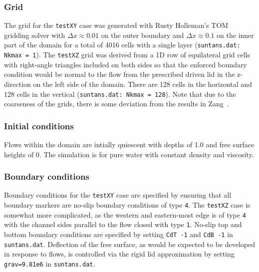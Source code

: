 \subsubsection{Grid}

The grid for the \verb+testXY+ case was generated with Rusty Holleman's 
TOM gridding solver with $\Delta x\approx 0.01$ on the outer boundary and 
$\Delta x \approx 0.1$ on the inner part of the domain for a total 
of 4016 cells with a single layer (\verb+suntans.dat: Nkmax = 1+). 
The \verb+testXZ+ grid
was derived from a 1D row of equilateral grid cells with right-angle triangles 
included on both sides so that the enforced boundary condition would be normal 
to the flow from the prescribed driven lid in the z-direction on the left side 
of the domain. There are 128 cells in the horizontal and 128 cells in the 
vertical (\verb+suntans.dat: Nkmax = 128+). Note that due to the coarseness of the grids, there is some 
deviation from  the results in Zang\etal~\cite{Zang[1994]}.  

\subsubsection{Initial conditions}

Flows within the domain are intially quiescent with depths of 1.0 and free 
surface heights of 0.  The simulation is for pure water with constant density
and viscosity.

\subsubsection{Boundary conditions}

Boundary conditions for the \verb+testXY+ case are specified by ensuring that 
all boundary markers are no-slip boundary conditions of type \verb+4+.  The 
\verb+testXZ+ case is somewhat more complicated, as the western and eastern-most
edge is of type \verb+4+ with the channel sides parallel to the flow closed with
type \verb+1+.  No-slip top and bottom boundary conditions are specified by
setting \verb+CdT -1+ and \verb+CdB -1+ in \verb+suntans.dat+.  Deflection of
the free surface, as would be expected to be developed in response to flows, is
controlled via the rigid lid approximation by setting \verb+grav=9.81e6+ in 
\verb+suntans.dat+.

